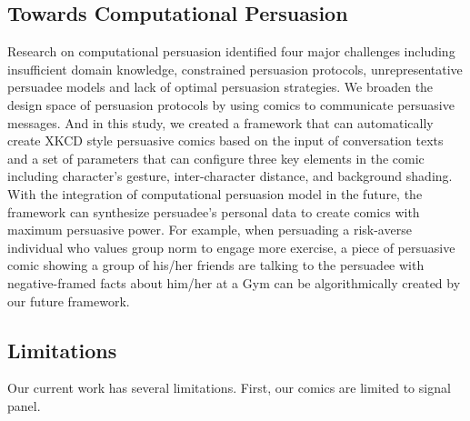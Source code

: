 \subsection{Towards Computational Persuasion}
Research on computational persuasion identified four major challenges including insufficient domain knowledge, constrained persuasion protocols, unrepresentative persuadee models and lack of optimal persuasion strategies\cite{huntertowards}. We broaden the design space of persuasion protocols by using comics to communicate persuasive messages. And in this study, we created a framework that can automatically create XKCD style persuasive comics based on the input of conversation texts and a set of parameters that can configure three key elements in the comic including character's gesture, inter-character distance, and background shading. With the integration of computational persuasion model in the future, the framework can synthesize persuadee's personal data to create comics with maximum persuasive power. For example, when persuading a risk-averse individual who values group norm to engage more exercise, a piece of persuasive comic showing a group of his/her friends are talking to the persuadee with negative-framed facts about him/her at a Gym can be algorithmically created by our future framework.

\subsection{Limitations}
Our current work has several limitations. First, our comics are limited to signal panel. 
